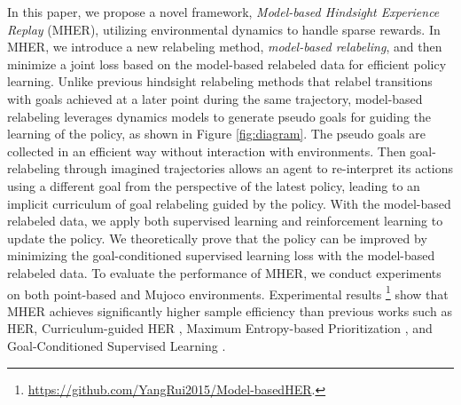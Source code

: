 \documentclass{article}
\begin{document}

In this paper, we propose a novel framework, \emph{Model-based Hindsight Experience Replay} (MHER), utilizing environmental dynamics to handle sparse rewards. In MHER, we introduce a new relabeling method, \emph{model-based relabeling}, and then minimize a joint loss based on the model-based relabeled data for efficient policy learning. Unlike previous hindsight relabeling methods that relabel transitions with goals achieved at a later point during the same trajectory, model-based relabeling leverages dynamics models to generate pseudo goals for guiding the learning of the policy, as shown in Figure \ref{fig:diagram}. The pseudo goals are collected in an efficient way without interaction with environments. Then goal-relabeling through imagined trajectories allows an agent to re-interpret its actions using a different goal from the perspective of the latest policy, leading to an implicit curriculum of goal relabeling guided by the policy. With the model-based relabeled data, we apply both supervised learning and reinforcement learning to update the policy. We theoretically prove that the policy can be improved by minimizing the goal-conditioned supervised learning loss \cite{ghosh2021learning} with the model-based relabeled data. To evaluate the performance of MHER, we conduct experiments on both point-based and Mujoco environments. Experimental results \footnote{\href{https://github.com/YangRui2015/Model-basedHER}{https://github.com/YangRui2015/Model-basedHER}.} show that MHER achieves significantly higher sample efficiency than previous works such as HER, Curriculum-guided HER \cite{fang2019curriculum}, Maximum Entropy-based Prioritization \cite{zhao2019maximum}, and Goal-Conditioned Supervised Learning \cite{ghosh2021learning}. 
\end{document}
